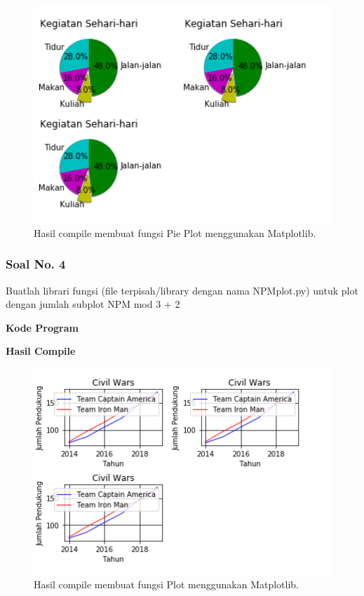 \begin{figure}[H]
	\includegraphics[width=12cm]{figures/6/1174034/Teori/p3.png}
	\centering
	\caption{Hasil compile membuat fungsi Pie Plot menggunakan Matplotlib.}
\end{figure}

\subsubsection{Soal No. 4}
\hfill \break
Buatlah librari fungsi (file terpisah/library dengan nama NPMplot.py) untuk plot dengan jumlah subplot NPM mod 3 + 2

\hfill \break
\textbf{Kode Program}



\hfill \break
\textbf{Hasil Compile}

\begin{figure}[H]
	\includegraphics[width=12cm]{figures/6/1174034/Teori/p4.png}
	\centering
	\caption{Hasil compile membuat fungsi Plot menggunakan Matplotlib.}
\end{figure}


